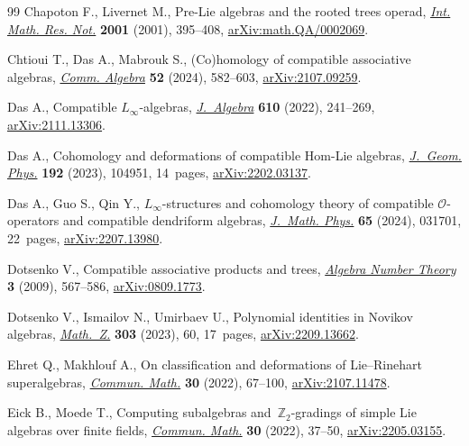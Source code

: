 \documentclass[pdftex]{sigma}
\numberwithin{equation}{section}
\begin{document}
\begin{thebibliography}{99}
Chapoton F., Livernet M., Pre-{L}ie algebras and the rooted trees operad,
 \href{https://doi.org/10.1155/S1073792801000198}{\textit{Int. Math. Res. Not.}} \textbf{2001} (2001), 395--408,
 \href{https://arxiv.org/abs/math.QA/0002069}{arXiv:math.QA/0002069}.

Chtioui T., Das A., Mabrouk S., ({C}o)homology of compatible associative
 algebras, \href{https://doi.org/10.1080/00927872.2023.2245915}{\textit{Comm. Algebra}} \textbf{52} (2024), 582--603,
 \href{https://arxiv.org/abs/2107.09259}{arXiv:2107.09259}.

Das A., Compatible {$L_\infty$}-algebras, \href{https://doi.org/10.1016/j.jalgebra.2022.07.020}{\textit{J.~Algebra}} \textbf{610}
 (2022), 241--269, \href{https://arxiv.org/abs/2111.13306}{arXiv:2111.13306}.

Das A., Cohomology and deformations of compatible {H}om-{L}ie algebras,
 \href{https://doi.org/10.1016/j.geomphys.2023.104951}{\textit{J.~Geom. Phys.}} \textbf{192} (2023), 104951, 14~pages,
 \href{https://arxiv.org/abs/2202.03137}{arXiv:2202.03137}.

Das A., Guo S., Qin Y., {$L_\infty$}-structures and cohomology theory of
 compatible {$\mathcal{O}$}-operators and compatible dendriform algebras,
 \href{https://doi.org/10.1063/5.0161898}{\textit{J.~Math. Phys.}} \textbf{65} (2024), 031701, 22~pages,
 \href{https://arxiv.org/abs/2207.13980}{arXiv:2207.13980}.

Dotsenko V., Compatible associative products and trees, \href{https://doi.org/10.2140/ant.2009.3.567}{\textit{Algebra Number
 Theory}} \textbf{3} (2009), 567--586, \href{https://arxiv.org/abs0809.1773}{arXiv:0809.1773}.

Dotsenko V., Ismailov N., Umirbaev U., Polynomial identities in {N}ovikov
 algebras, \href{https://doi.org/10.1007/s00209-023-03231-8}{\textit{Math.~Z.}} \textbf{303} (2023), 60, 17~pages,
 \href{https://arxiv.org/abs/2209.13662}{arXiv:2209.13662}.

Ehret Q., Makhlouf A., On classification and deformations of {L}ie--{R}inehart
 superalgebras, \href{https://doi.org/10.46298/cm.10537}{\textit{Commun. Math.}} \textbf{30} (2022), 67--100,
 \href{https://arxiv.org/abs/2107.11478}{arXiv:2107.11478}.

Eick B., Moede T., Computing subalgebras and~{$\mathbb Z_2$}-gradings of simple
 {L}ie algebras over finite fields, \href{https://doi.org/10.46298/cm.10193}{\textit{Commun. Math.}} \textbf{30} (2022),
 37--50, \href{https://arxiv.org/abs/2205.03155}{arXiv:2205.03155}.


\end{thebibliography}
\end{document}
